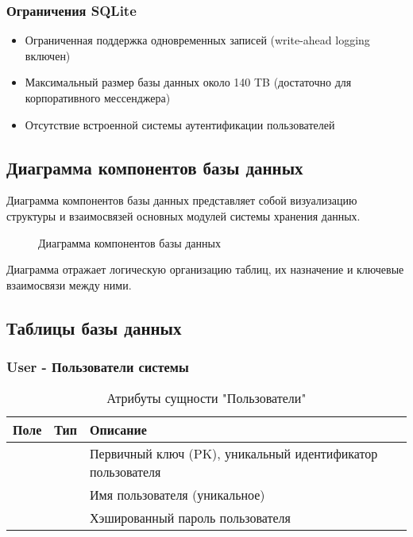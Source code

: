 \subsubsection{Ограничения SQLite}
\begin{itemize}
	\item Ограниченная поддержка одновременных записей (write-ahead logging включен)
	\item Максимальный размер базы данных около 140 TB (достаточно для корпоративного мессенджера)
	\item Отсутствие встроенной системы аутентификации пользователей
\end{itemize}

\subsection{Диаграмма компонентов базы данных}

Диаграмма компонентов базы данных представляет собой визуализацию структуры и взаимосвязей основных модулей системы хранения данных.

\begin{figure}[ht]
\caption{Диаграмма компонентов базы данных}
\label{comp:image}
\end{figure}

Диаграмма отражает логическую организацию таблиц, их назначение и ключевые взаимосвязи между ними.

\subsection{Таблицы базы данных}
\subsubsection{User - Пользователи системы}
\begin{xltabular}{\textwidth}{|l|l|X|}
	\caption{Атрибуты сущности "Пользователи"\label{user:table}}\\ \hline
	\centrow Поле & \centrow Тип & \centrow Описание \\ \hline
	 &  & Первичный ключ (PK), уникальный идентификатор пользователя \\ \hline
	 &  & Имя пользователя (уникальное) \\ \hline
	 &  & Хэшированный пароль пользователя \\ \hline
\end{xltabular}

